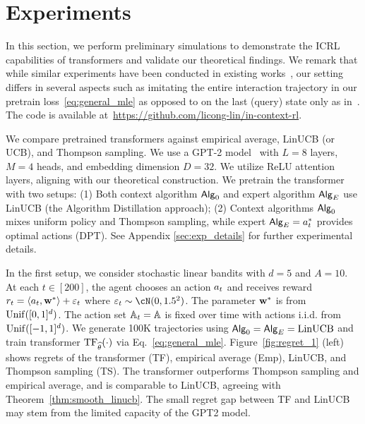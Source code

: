 \section{Experiments}
\label{sec:experiments}




In this section, we perform preliminary simulations to demonstrate the ICRL capabilities of transformers and validate our theoretical findings. We remark that while similar experiments have been conducted in existing works~\citep{laskin2022context,lee2023supervised}, our setting differs in several aspects such as imitating the entire interaction trajectory in our pretrain loss~\eqref{eq:general_mle} as opposed to on the last (query) state only as in~\citet{lee2023supervised}. The code is available at~\href{https://github.com/licong-lin/in-context-rl}{https://github.com/licong-lin/in-context-rl}.




We compare pretrained transformers against empirical average, LinUCB (or UCB), and Thompson sampling. We use a GPT-2 model~\cite{garg2022can,lee2023supervised} with $L = 8$ layers, $M=4$ heads, and embedding dimension $D=32$. We utilize ReLU attention layers, aligning with our theoretical construction. We pretrain the transformer with two setups: (1) Both context algorithm ${\mathsf{Alg}}_0$ and expert algorithm ${\mathsf{Alg}}_{{E}}$ use LinUCB (the Algorithm Distillation approach); (2) Context algorithms ${\mathsf{Alg}}_0$ mixes uniform policy and Thompson sampling, while expert ${\mathsf{Alg}}_{{E}} = {a}_t^*$ provides optimal actions (DPT). See Appendix \ref{sec:exp_details} for further experimental details.


In the first setup, we consider stochastic linear bandits with $d=5$ and $A=10$. At each $t \in [200]$, the agent chooses an action ${a}_t$ and receives reward ${r}_t=\left\langle{a}_t,{\mathbf w}^*\right\rangle+\varepsilon_t$ where $\eps_t\sim\cN(0,1.5^2)$. The parameter ${\mathbf w}^*$ is from ${\rm Unif}([0,1]^d)$. The action set ${\mathbb{A}}_t={\mathbb{A}}$ is fixed over time with actions i.i.d. from ${\rm Unif}([-1, 1]^d)$. We generate 100K trajectories using ${\mathsf{Alg}}_0={\mathsf{Alg}}_{{E}}={\mathrm{LinUCB}}$ and train transformer ${\rm TF}_{\widehat{\theta}}(\cdot)$ via Eq.~\eqref{eq:general_mle}. Figure~\ref{fig:regret_1} (left) shows regrets of the transformer (TF), empirical average (Emp), LinUCB, and Thompson sampling (TS). The transformer outperforms Thompson sampling and empirical average, and is comparable to LinUCB, agreeing with Theorem~\ref{thm:smooth_linucb}. The small regret gap between TF and LinUCB may stem from the limited capacity of the GPT2 model.




